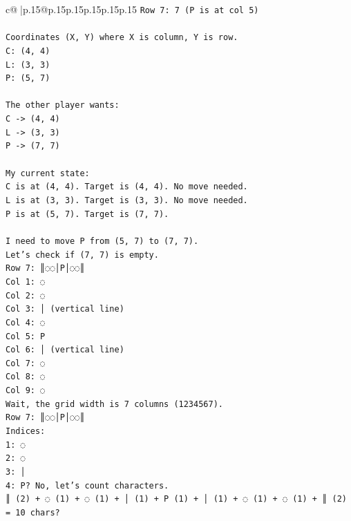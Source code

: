 \documentclass{article}
\begin{document}
{\begin{supertabular}{c@{$\;$}|p{.15\linewidth}@{}p{.15\linewidth}p{.15\linewidth}p{.15\linewidth}p{.15\linewidth}p{.15\linewidth}}
{{{\texttt{Row 7: 7 (P is at col 5)} \\
\\ 
\texttt{Coordinates (X, Y) where X is column, Y is row.} \\
\texttt{C: (4, 4)} \\
\texttt{L: (3, 3)} \\
\texttt{P: (5, 7)} \\
\\ 
\texttt{The other player wants:} \\
\texttt{C {-}> (4, 4)} \\
\texttt{L {-}> (3, 3)} \\
\texttt{P {-}> (7, 7)} \\
\\ 
\texttt{My current state:} \\
\texttt{C is at (4, 4). Target is (4, 4). No move needed.} \\
\texttt{L is at (3, 3). Target is (3, 3). No move needed.} \\
\texttt{P is at (5, 7). Target is (7, 7).} \\
\\ 
\texttt{I need to move P from (5, 7) to (7, 7).} \\
\texttt{Let's check if (7, 7) is empty.} \\
\texttt{Row 7: ║◌◌│P│◌◌║} \\
\texttt{Col 1: ◌} \\
\texttt{Col 2: ◌} \\
\texttt{Col 3: │ (vertical line)} \\
\texttt{Col 4: ◌} \\
\texttt{Col 5: P} \\
\texttt{Col 6: │ (vertical line)} \\
\texttt{Col 7: ◌} \\
\texttt{Col 8: ◌} \\
\texttt{Col 9: ◌} \\
\texttt{Wait, the grid width is 7 columns (1234567).} \\
\texttt{Row 7: ║◌◌│P│◌◌║} \\
\texttt{Indices:} \\
\texttt{1: ◌} \\
\texttt{2: ◌} \\
\texttt{3: │} \\
\texttt{4: P? No, let's count characters.} \\
\texttt{║ (2) + ◌ (1) + ◌ (1) + │ (1) + P (1) + │ (1) + ◌ (1) + ◌ (1) + ║ (2) = 10 chars?} \\
}}}
\end{supertabular}}
\end{document}
